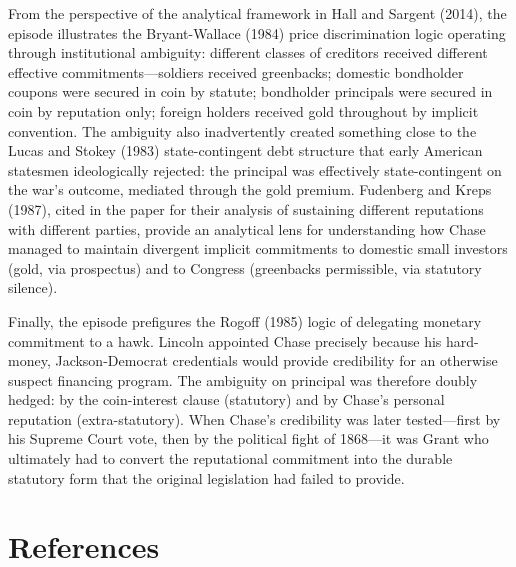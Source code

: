 \documentclass[12pt]{article}
\begin{document}
From the perspective of the analytical framework in Hall and Sargent
(2014), the episode illustrates the Bryant-Wallace (1984) price
discrimination logic operating through institutional ambiguity: different
classes of creditors received different effective commitments---soldiers
received greenbacks; domestic bondholder coupons were secured in coin by
statute; bondholder principals were secured in coin by reputation only;
foreign holders received gold throughout by implicit convention. The
ambiguity also inadvertently created something close to the Lucas and
Stokey (1983) state-contingent debt structure that early American
statesmen ideologically rejected: the principal was effectively
state-contingent on the war's outcome, mediated through the gold premium.
Fudenberg and Kreps (1987), cited in the paper for their analysis of
sustaining different reputations with different parties, provide an
analytical lens for understanding how Chase managed to maintain divergent
implicit commitments to domestic small investors (gold, via prospectus)
and to Congress (greenbacks permissible, via statutory silence).

Finally, the episode prefigures the Rogoff (1985) logic of delegating
monetary commitment to a hawk. Lincoln appointed Chase precisely because
his hard-money, Jackson-Democrat credentials would provide credibility
for an otherwise suspect financing program. The ambiguity on principal
was therefore doubly hedged: by the coin-interest clause (statutory) and
by Chase's personal reputation (extra-statutory). When Chase's
credibility was later tested---first by his Supreme Court vote, then by
the political fight of 1868---it was Grant who ultimately had to convert
the reputational commitment into the durable statutory form that the
original legislation had failed to provide.

\section*{References}
\end{document}
